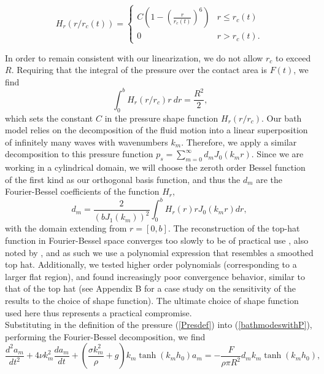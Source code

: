\documentclass{jfm}
\begin{document}
\begin{equation}
H_r(r/r_c(t)) =  \begin{cases} 
      C \left( 1 - (\frac{r}{r_c(t)})^6 \right) & r\leq r_c(t) \\
      0 & r > r_c(t) \text{.}
   \end{cases}
\end{equation}

In order to remain consistent with our linearization, we do not allow $r_c$ to exceed $R$.  Requiring that the integral of the pressure over the contact area is $F(t)$, we find
\begin{equation}
   \int_0^{b} H_r(r/r_c) r \ dr = \frac{R^2}{2} \text{,}
\end{equation}
which sets the constant $C$ in the pressure shape function $H_r(r/r_c)$. Our bath model relies on the decomposition of the fluid motion into a linear superposition of infinitely many waves with wavenumbers $k_m$. Therefore, we apply a similar decomposition to this pressure function $p_s=\sum_{m=0}^{\infty} d_m J_0(k_m r)$. Since we are working in a cylindrical domain, we will choose the zeroth order Bessel function of the first kind as our orthogonal basis function, and thus the $d_m$ are the Fourier-Bessel coefficients of the function $H_r$,
\begin{equation}
    d_m = \frac{2}{(b J_1(k_m))^2}\int_0^b H_r(r) r J_0(k_m r) dr, 
\end{equation} with the domain extending from $r=[0,b]$. The reconstruction of the top-hat function in Fourier-Bessel space converges too slowly to be of practical use \citep{storey1968convergence}, also noted by \cite{blanchette2016modeling}, and as such we use a polynomial expression that resembles a smoothed top hat. Additionally, we tested higher order polynomials (corresponding to a larger flat region), and found increasingly poor convergence behavior, similar to that of the top hat (see Appendix B for a case study on the sensitivity of the results to the choice of shape function).  The ultimate choice of shape function used here thus represents a practical compromise.\\
\hspace*{1em} Substituting in the definition of the pressure (\ref{Presdef}) into (\ref{bathmodeswithP}), performing the Fourier-Bessel decomposition, we find
\begin{equation}
    \frac{d^2 a_m}{dt^2} + 4 \nu k_m^2 \frac{da_m}{dt} + \left(\frac{\sigma k_m^2}{\rho} + g\right)k_m\tanh{(k_m h_0)}a_m = -\frac{F}{\rho \pi R^2} d_{m} k_m\tanh{(k_m h_0)} \text{,}
\end{equation}
\end{document}

